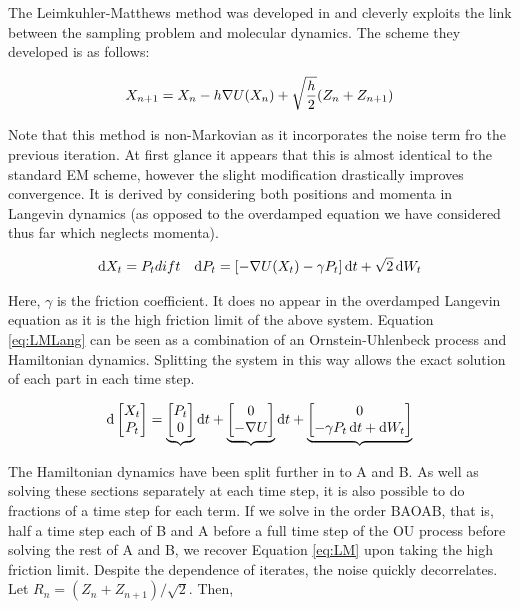 The Leimkuhler-Matthews method was developed in \cite{LM12} and cleverly exploits the link between the sampling problem and molecular dynamics. The scheme they developed is as follows:

\begin{equation} X_{n+1} = X_n - h \nabla U (X_n) +\sqrt{\frac{h}{2}} (Z_n+Z_{n+1}) \label{eq:LM} \end{equation}

Note that this method is non-Markovian as it incorporates the noise term fro the previous iteration. At first glance it appears that this is almost identical to the standard EM scheme, however the slight modification drastically improves convergence.  It is derived by considering both positions and momenta in Langevin dynamics (as opposed to the overdamped equation we have considered thus far which neglects momenta).

\begin{align} \mathop{}\!\mathrm{d} X_t = P_t dif t && \mathop{}\!\mathrm{d} P_t = \lbrack -\nabla U(X_t) - \gamma P_t \rbrack \mathop{}\!\mathrm{d} t + \sqrt{2} \mathop{}\!\mathrm{d} W_t \label{eq:LMLang} \end{align}

Here, \(\gamma\) is the friction coefficient. It does no appear in the overdamped Langevin equation as it is the high friction limit of the above system.  Equation \eqref{eq:LMLang} can be seen as a combination of an Ornstein-Uhlenbeck process and Hamiltonian dynamics. Splitting the system in this way allows the exact solution of each part in each time step.

\[ \mathop{}\!\mathrm{d} \begin{bmatrix} X_t\\P_t \end{bmatrix} = \underbrace{\begin{bmatrix} P_t \\ 0 \end{bmatrix}} \mathop{}\!\mathrm{d} t + \underbrace{\begin{bmatrix}  0\\-\nabla U \end{bmatrix}} \mathop{}\!\mathrm{d} t + \underbrace{\begin{bmatrix} 0\\ -\gamma P_t \mathop{}\!\mathrm{d} t + \mathop{}\!\mathrm{d} W_t \end{bmatrix}} \]

The Hamiltonian dynamics have been split further in to A and B.  As well as solving these sections separately at each time step, it is also possible to do fractions of a time step for each term. If we solve in the order BAOAB, that is, half a time step each of B and A before a full time step of the OU process before solving the rest of A and B, we recover Equation \eqref{eq:LM} upon taking the high friction limit. Despite the dependence of iterates, the noise quickly decorrelates. Let \(R_n = (Z_n+Z_{n+1})/\sqrt{2}\). Then,


